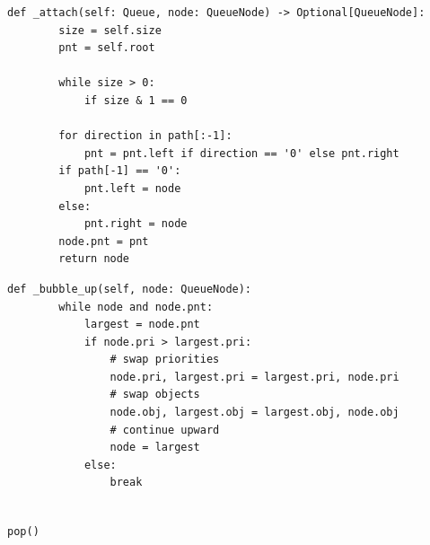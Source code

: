 \documentclass[mathserif, handout]{beamer}
\begin{document}
\begin{frame}[fragile]
\begin{thmboxside}
\begin{lstlisting}[style=mypython]
    def _attach(self: Queue, node: QueueNode) -> Optional[QueueNode]:
        size = self.size
        pnt = self.root
        
        while size > 0:
            if size & 1 == 0     
        
        for direction in path[:-1]:
            pnt = pnt.left if direction == '0' else pnt.right
        if path[-1] == '0':
            pnt.left = node
        else:
            pnt.right = node
        node.pnt = pnt
        return node
\end{lstlisting}
\end{thmboxside}
\end{frame}



\begin{frame}[fragile]
\begin{thmboxbot}
\begin{lstlisting}[style=mypython]
    def _bubble_up(self, node: QueueNode):
        while node and node.pnt:
            largest = node.pnt
            if node.pri > largest.pri:
                # swap priorities
                node.pri, largest.pri = largest.pri, node.pri
                # swap objects
                node.obj, largest.obj = largest.obj, node.obj
                # continue upward
                node = largest
            else:
                break
\end{lstlisting}
\end{thmboxbot}
\end{frame}

\begin{frame}
\begin{center}
 \\
\footnotesize\color{gray} \texttt{pop()}
\end{center}
\begin{center}

\end{center}
\begin{center}
\footnotesize\color{gray} \;
\end{center}    

\end{frame}
\end{document}
